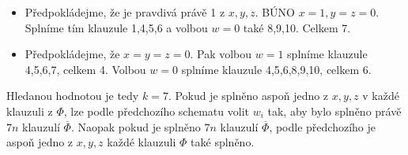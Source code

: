 \documentclass[a4wide,8pt]{extarticle}
\begin{document}
\begin{enumerate}
\begin{itemize}
			\item Předpokládejme, že je pravdivá právě 1 z $x,y,z$. BÚNO $x=1, y=z=0$. Splníme tím klauzule 1,4,5,6 a volbou $w=0$ také 8,9,10. Celkem 7.
			\item Předpokládejme, že $x=y=z=0$. Pak volbou $w=1$ splníme klauzule 4,5,6,7, celkem 4. Volbou $w=0$ splníme klauzule 4,5,6,8,9,10, celkem 6.
		\end{itemize}
		Hledanou hodnotou je tedy $k=7$. Pokud je splněno aspoň jedno z $x,y,z$ v každé klauzuli z $\Phi$, lze podle předchozího schematu volit $w_i$ tak, aby bylo splněno právě $7n$ klauzulí $\overline{\Phi}$. Naopak pokud je splněno $7n$ klauzulí $\overline{\Phi}$, podle předchozího je aspoň jedno z $x,y,z$ každé klauzuli $\Phi$ také splněno.
\end{enumerate}
\end{document}
